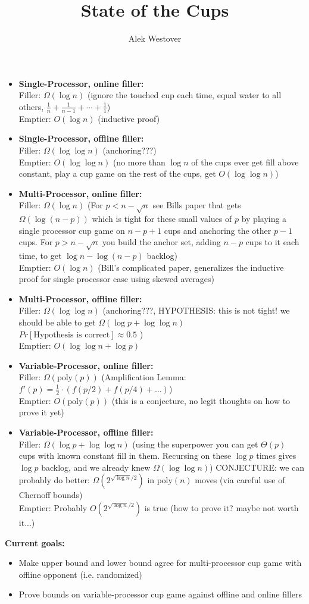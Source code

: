 \documentclass{article}[11pt]
\author{Alek Westover}
\title{State of the Cups}
\begin{document}
\maketitle

\begin{itemize}
  \item \textbf{Single-Processor, online filler: } \\
    Filler: $\Omega(\log n)$ (ignore the touched cup each time, equal water to all others, $\frac{1}{n}+\frac{1}{n-1}  + \cdots + \frac{1}{1}$)\\
    Emptier: $O(\log n)$ (inductive proof)
  \item \textbf{Single-Processor, offline filler: } \\
    Filler: $\Omega(\log\log n)$ (anchoring???) \\
    Emptier: $O(\log\log n)$ (no more than $\log n$ of the cups ever get fill above constant, play a cup game on the rest of the cups, get $O(\log \log n)$)
  \item \textbf{Multi-Processor, online filler: } \\
    Filler: $\Omega(\log n)$ (For $p < n-\sqrt{n}$ see Bills paper that gets $\Omega(\log (n-p))$ which is tight for these small values of $p$ by playing a single processor cup game on $n-p+1$ cups and anchoring the other $p-1$ cups. For $p>n-\sqrt{n}$ you build the anchor set, adding $n-p$ cups to it each time, to get $\log n - \log (n-p)$ backlog)\\
    Emptier: $O(\log n)$ (Bill's complicated paper, generalizes the inductive proof for single processor case using skewed averages)
  \item \textbf{Multi-Processor, offline filler: } \\
    Filler: $\Omega(\log\log n)$ (anchoring???, HYPOTHESIS: this is not tight! we should be able to get $\Omega(\log p + \log \log n)$ $Pr[\text{Hypothesis is correct}] \approx 0.5$ ) \\
    Emptier: $O(\log\log n + \log p)$  
  \item \textbf{Variable-Processor, online filler: } \\
    Filler: $\Omega(\text{poly}(p))$ (Amplification Lemma: $f'(p) = \frac{1}{2}\cdot(f(p/2) + f(p/4) + \ldots)$) \\
    Emptier: $O(\text{poly}(p))$ (this is a conjecture, no legit thoughts on how to prove it yet)
  \item \textbf{Variable-Processor, offline filler: } \\
    Filler: $\Omega(\log p + \log \log n)$ (using the superpower you can get $\Theta(p)$ cups with known constant fill in them. Recursing on these $\log p$ times gives $\log p$ backlog, and we already knew $\Omega(\log\log n)$) CONJECTURE: we can probably do better: $\Omega(2^{\sqrt{\log n} /2})$ in $\text{poly}(n)$ moves (via careful use of Chernoff bounds)\\
    Emptier: Probably $O(2^{\sqrt{\log n} /2})$ is true (how to prove it? maybe not worth it...)
  
\end{itemize}

\textbf{Current goals:}
\begin{itemize}
  \item Make upper bound and lower bound agree for multi-processor cup game with offline opponent (i.e. randomized)
  \item Prove bounds on variable-processor cup game against offline and online fillers
\end{itemize}
\end{document}
